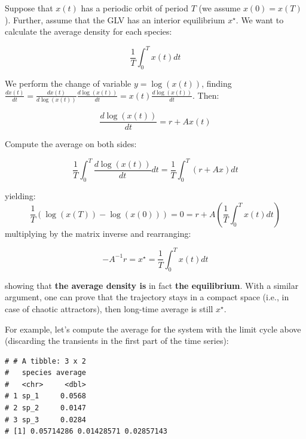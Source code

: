 \documentclass[]{book}
\newenvironment{Shaded}{\begin{snugshade}}{\end{snugshade}}
\newcommand{\CommentTok}[1]{\textcolor[rgb]{0.56,0.35,0.01}{\textit{#1}}}
\newcommand{\DataTypeTok}[1]{\textcolor[rgb]{0.13,0.29,0.53}{#1}}
\newcommand{\DecValTok}[1]{\textcolor[rgb]{0.00,0.00,0.81}{#1}}
\newcommand{\KeywordTok}[1]{\textcolor[rgb]{0.13,0.29,0.53}{\textbf{#1}}}
\newcommand{\NormalTok}[1]{#1}
\newcommand{\OperatorTok}[1]{\textcolor[rgb]{0.81,0.36,0.00}{\textbf{#1}}}
\newcommand{\StringTok}[1]{\textcolor[rgb]{0.31,0.60,0.02}{#1}}
\begin{document}
Suppose that \(x(t)\) has a periodic orbit of period \(T\) (we assume \(x(0) = x(T)\)). Further, assume that the GLV has an interior equilibrium \(x^\star\). We want to calculate the average density for each species:

\[
\frac{1}{T} \int_0^T x(t) dt
\]

We perform the change of variable \(y = \log(x(t))\), finding \(\frac{d x(t)}{dt} = \frac{d x(t)}{d \log(x(t))}\frac{d \log(x(t))}{dt} = x(t)\frac{d \log(x(t))}{dt}\). Then:

\[
\frac{d \log(x(t))}{dt} = r + Ax(t)
\]

Compute the average on both sides:

\[
\frac{1}{T}\int_0^T \frac{d \log(x(t))}{dt} dt= \frac{1}{T}\int_0^T \left(r + Ax \right) dt
\]

yielding:
\[
\frac{1}{T}(\log(x(T)) - \log(x(0))) = 0 = r + A \left( \frac{1}{T} \int_0^T x(t) dt \right)
\]
multiplying by the matrix inverse and rearranging:

\[
-A^{-1} r = x^\star =  \frac{1}{T} \int_0^T x(t) dt 
\]

showing that \textbf{the average density is} in fact \textbf{the equilibrium}. With a similar argument, one can prove that the trajectory stays in a compact space (i.e., in case of chaotic attractors), then long-time average is still \(x^\star\).

For example, let's compute the average for the system with the limit cycle above (discarding the transients in the first part of the time series):

\begin{Shaded}
\end{Shaded}

\begin{verbatim}
# # A tibble: 3 x 2
#   species average
#   <chr>     <dbl>
# 1 sp_1     0.0568
# 2 sp_2     0.0147
# 3 sp_3     0.0284
# [1] 0.05714286 0.01428571 0.02857143
\end{verbatim}
\end{document}
